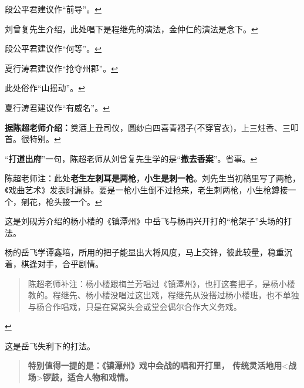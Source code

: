 \item
  \leavevmode\hypertarget{fn528}{}%
  段公平君建议作``前导''。\protect\hyperlink{fnref528}{↩}
\item
  \leavevmode\hypertarget{fn529}{}%
  刘曾复先生介绍，此处唱下是程继先的演法，金仲仁的演法是念下。\protect\hyperlink{fnref529}{↩}
\item
  \leavevmode\hypertarget{fn530}{}%
  段公平君建议作``何等''。\protect\hyperlink{fnref530}{↩}
\item
  \leavevmode\hypertarget{fn531}{}%
  夏行涛君建议作``抢夺州郡''。\protect\hyperlink{fnref531}{↩}
\item
  \leavevmode\hypertarget{fn532}{}%
  此处俗作``山摇动''。\protect\hyperlink{fnref532}{↩}
\item
  \leavevmode\hypertarget{fn533}{}%
  夏行涛君建议作``有威名''。\protect\hyperlink{fnref533}{↩}
\item
  \leavevmode\hypertarget{fn534}{}%
  \textbf{据陈超老师介绍：}奠酒上丑司仪，圆纱白四喜青褶子(不穿官衣)，上三炷香、三叩首。很特别。\protect\hyperlink{fnref534}{↩}
\item
  \leavevmode\hypertarget{fn535}{}%
  ``\textbf{打道出府}''一句，陈超老师从刘曾复先生学的是``\textbf{撤去香案}''。省事。\protect\hyperlink{fnref535}{↩}
\item
  \leavevmode\hypertarget{fn536}{}%
  陈超老师注：此处\textbf{老生左刺耳是两枪}，\textbf{小生是刺一枪}。刘先生当初稿里写了两枪，《戏曲艺术》发表时漏排。要是一枪小生倒不过抢来，老生刺两枪，小生枪鐏接一个，剜花，枪头接一个。\protect\hyperlink{fnref536}{↩}
\item
  \leavevmode\hypertarget{fn537}{}%
  这是刘砚芳介绍的杨小楼的《镇潭州》中岳飞与杨再兴开打的``枪架子''头场的打法。

  杨的岳飞学谭鑫培，所用的把子能显出大将风度，马上交锋，彼此较量，稳重沉着，棋逢对手，合乎剧情。

  \begin{quote}
  陈超老师补注：杨小楼跟梅兰芳唱过《镇潭州》，也打这套把子，是杨小楼教的。程继先、杨小楼没唱过这出戏，程继先从没搭过杨小楼班，也不单独与杨合作唱戏，只是在窝窝头会或堂会偶尔合作大义务戏。
  \end{quote}

  \protect\hyperlink{fnref537}{↩}
\item
  \leavevmode\hypertarget{fn538}{}%
  这是岳飞失利下的打法。

  \begin{quote}
  \textbf{特别值得一提的是：《镇潭州》戏中会战的唱和开打里，
  传统灵活地用}\textless{}\textbf{战场}\textgreater{}\textbf{锣鼓，适合人物和戏情。}
  \end{quote}

